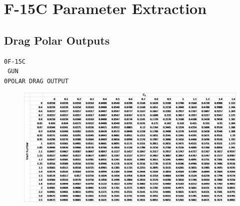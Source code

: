 \chapter{F-15C Parameter Extraction}
\renewcommand\thesection{\Alpha {A}}

\section{Drag Polar Outputs}
\label{app: polar}
\begin{verbatim}
0F-15C                               
 GUN                                      
0POLAR DRAG OUTPUT
\end{verbatim}
\begin{figure}[H]
    \centering
    \includegraphics[width = 15cm]{Thesis/Appendices/Drag_Polar_Example.png}
\end{figure}
